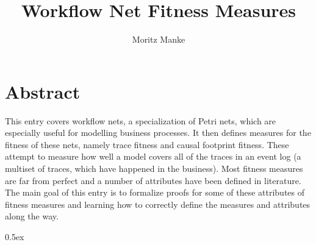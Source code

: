 \documentclass[11pt,a4paper]{book}
\begin{document}
\title{Workflow Net Fitness Measures}
\author{Moritz Manke}
\maketitle
\chapter*{Abstract}

This entry covers workflow nets, a specialization of Petri nets, which are especially useful for modelling business processes. It then defines measures for the fitness of these nets, namely trace fitness and causal footprint fitness. These attempt to measure how well a model covers all of the traces in an event log (a multiset of traces, which have happened in the business). Most fitness measures are far from perfect and a number of attributes have been defined in literature.
The main goal of this entry is to formalize proofs for some of these attributes of fitness measures and learning how to correctly define the measures and attributes along the way.

\tableofcontents

\parindent 0pt\parskip 0.5ex





\end{document}

